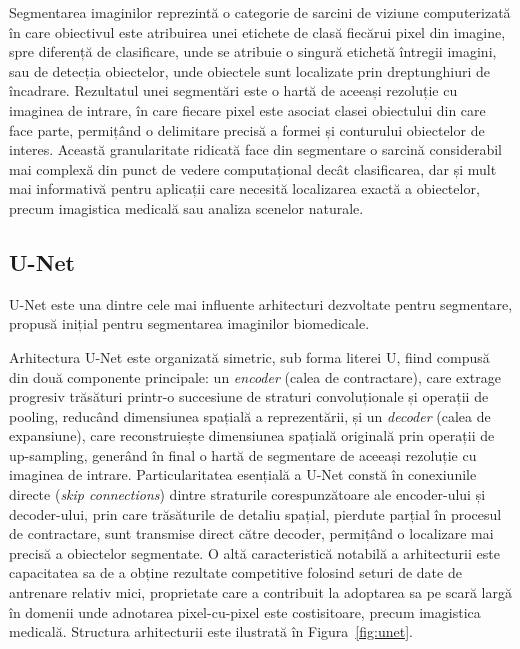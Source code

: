 Segmentarea imaginilor reprezintă o categorie de sarcini de viziune computerizată
în care obiectivul este atribuirea unei etichete de clasă fiecărui pixel din imagine, spre diferență  de clasificare, unde se atribuie o singură etichetă întregii imagini, sau de detecția obiectelor, unde obiectele sunt localizate prin dreptunghiuri de încadrare. Rezultatul unei segmentări este o hartă de aceeași rezoluție cu imaginea de intrare, în care fiecare pixel este asociat clasei obiectului din care face parte, permițând o delimitare precisă a formei și conturului obiectelor de interes. Această granularitate ridicată face din segmentare o sarcină considerabil mai complexă din punct de vedere computațional decât clasificarea, dar și mult mai informativă pentru aplicații care necesită localizarea exactă a obiectelor, precum imagistica medicală sau analiza scenelor naturale.

\subsection{U-Net}

U-Net \cite{ronneberger2015unet} este una dintre cele mai influente arhitecturi dezvoltate pentru segmentare, propusă inițial pentru segmentarea imaginilor biomedicale.

Arhitectura U-Net este organizată simetric, sub forma literei U, fiind compusă din două componente principale: un {\it encoder} (calea de contractare), care extrage progresiv trăsături printr-o succesiune de straturi convoluționale și operații de pooling, reducând dimensiunea spațială a reprezentării, și un {\it decoder} (calea de expansiune), care reconstruiește dimensiunea spațială originală prin operații de up-sampling, generând în final o hartă de segmentare de aceeași rezoluție cu imaginea de intrare. Particularitatea esențială a U-Net constă în conexiunile directe (\textit{skip connections}) dintre straturile corespunzătoare ale encoder-ului și decoder-ului, prin care trăsăturile de detaliu spațial, pierdute parțial în procesul de contractare, sunt transmise direct către decoder, permițând o localizare mai precisă a obiectelor segmentate. O altă caracteristică notabilă a arhitecturii este capacitatea sa de a obține rezultate competitive folosind seturi de date de antrenare relativ mici, proprietate care a contribuit la adoptarea sa pe scară largă în domenii unde adnotarea pixel-cu-pixel este costisitoare, precum imagistica medicală. Structura arhitecturii este ilustrată în Figura~\ref{fig:unet}.

